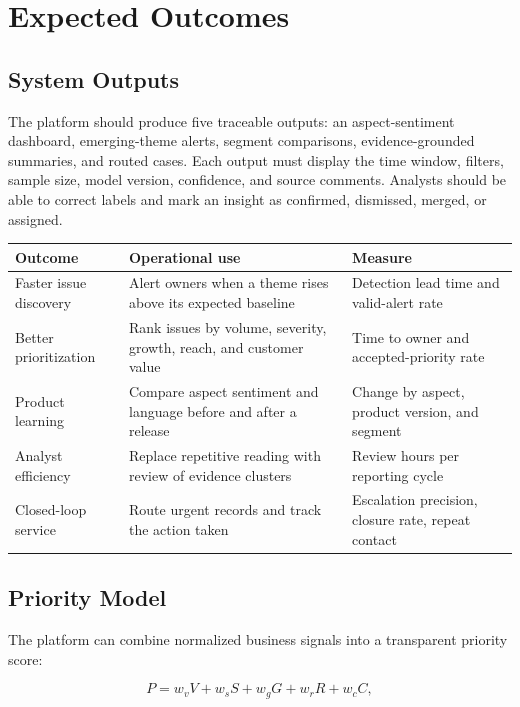 \documentclass[11pt,a4paper,twoside]{article}
\begin{document}
\newpage

\section{Expected Outcomes}

\subsection{System Outputs}

The platform should produce five traceable outputs: an aspect-sentiment dashboard, emerging-theme alerts, segment comparisons, evidence-grounded summaries, and routed cases. Each output must display the time window, filters, sample size, model version, confidence, and source comments. Analysts should be able to correct labels and mark an insight as confirmed, dismissed, merged, or assigned.

\begin{tabularx}{\textwidth}{|>{\raggedright\arraybackslash}p{3.05cm}|Y|Y|}
\hline
\textbf{Outcome} & \textbf{Operational use} & \textbf{Measure} \\ \hline
Faster issue discovery & Alert owners when a theme rises above its expected baseline & Detection lead time and valid-alert rate \\ \hline
Better prioritization & Rank issues by volume, severity, growth, reach, and customer value & Time to owner and accepted-priority rate \\ \hline
Product learning & Compare aspect sentiment and language before and after a release & Change by aspect, product version, and segment \\ \hline
Analyst efficiency & Replace repetitive reading with review of evidence clusters & Review hours per reporting cycle \\ \hline
Closed-loop service & Route urgent records and track the action taken & Escalation precision, closure rate, repeat contact \\ \hline
\end{tabularx}

\subsection{Priority Model}

The platform can combine normalized business signals into a transparent priority score:

\[
P = w_v V + w_s S + w_g G + w_r R + w_c C,
\]
\end{document}
